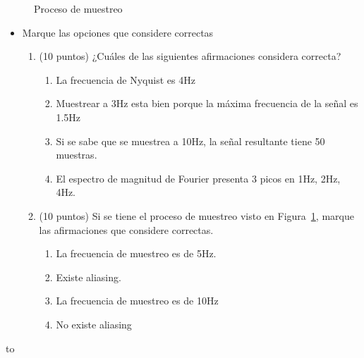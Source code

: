 \documentclass[12pt,a4paper]{article}
\providecommand{\tightlist}{%
  \setlength{\itemsep}{0pt}\setlength{\parskip}{0pt}}\usepackage{longtable,booktabs,array}
\providecommand{\tightlist}{%
  \setlength{\itemsep}{0pt}\setlength{\parskip}{2pt}}
\providecommand{\thisistheend}{\vfill{\hbox to \textwidth{\hfil * * * * * * * * * * * * * * *\hfil}}\vfill}
\begin{document}
\begin{figure}


\caption{\label{fig-muestreo}Proceso de muestreo}

\end{figure}%

\begin{itemize}
\item
  Marque las opciones que considere correctas

  \begin{enumerate}
  \tightlist
  \item
    (10 puntos) ¿Cuáles de las siguientes afirmaciones considera
    correcta?

    \begin{enumerate}
    \tightlist
    \item
      La frecuencia de Nyquist es 4Hz
    \item
      Muestrear a 3Hz esta bien porque la máxima frecuencia de la señal
      es 1.5Hz
    \item
      Si se sabe que se muestrea a 10Hz, la señal resultante tiene 50
      muestras.
    \item
      El espectro de magnitud de Fourier presenta 3 picos en 1Hz, 2Hz,
      4Hz.
    \end{enumerate}
  \item
    (10 puntos) Si se tiene el proceso de muestreo visto en
    Figura~\ref{fig-muestreo}, marque las afirmaciones que considere
    correctas.

    \begin{enumerate}
    \tightlist
    \item
      La frecuencia de muestreo es de 5Hz.
    \item
      Existe aliasing.
    \item
      La frecuencia de muestreo es de 10Hz
    \item
      No existe aliasing
    \end{enumerate}
  \end{enumerate}
\end{itemize}

\thisistheend
\pagebreak
\end{document}
